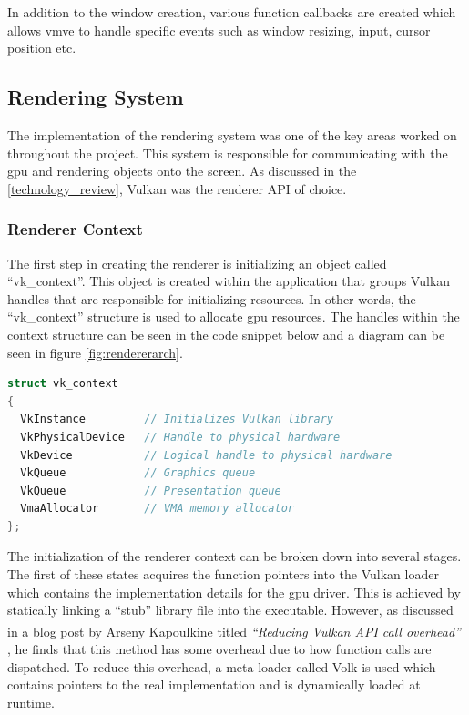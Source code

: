 \documentclass[11pt]{article}
\begin{document}
In addition to the window creation, various function callbacks are created
which allows \gls*{vmve} to handle specific events such as window resizing, input,
cursor position etc.

\subsection{Rendering System}
The implementation of the rendering system was one of the key areas worked on
throughout the project. This system is responsible for communicating with the
\gls*{gpu} and rendering objects onto the screen. As discussed in the
\ref{technology_review}, Vulkan was the renderer API of choice. 

    

\subsubsection{Renderer Context}
The first step in creating the renderer is initializing an object called
``vk\_context''. This object is created within the application that groups Vulkan
handles that are responsible for initializing resources. In other words, the
``vk\_context'' structure is used to allocate \gls*{gpu} resources. The handles
within the context structure can be seen in the code snippet below and a diagram
can be seen in figure \ref{fig:rendererarch}.

\begin{lstlisting}[language=C++]
struct vk_context
{
  VkInstance         // Initializes Vulkan library
  VkPhysicalDevice   // Handle to physical hardware
  VkDevice           // Logical handle to physical hardware
  VkQueue            // Graphics queue
  VkQueue            // Presentation queue
  VmaAllocator       // VMA memory allocator
};
\end{lstlisting}

The initialization of the renderer context can be broken down into several
stages. The first of these states acquires the function pointers into the Vulkan
loader which contains the implementation details for the \gls*{gpu} driver. This
is achieved by statically linking a ``stub'' library file into the executable.
However, as discussed in a blog post by Arseny Kapoulkine titled
\textit{``Reducing Vulkan\textsuperscript{\textregistered} API call overhead''}
\cite{volk}, he finds that this method has some overhead due to how function
calls are dispatched. To reduce this overhead, a meta-loader called Volk is used
which contains pointers to the real implementation and is dynamically loaded at
runtime.
\end{document}
